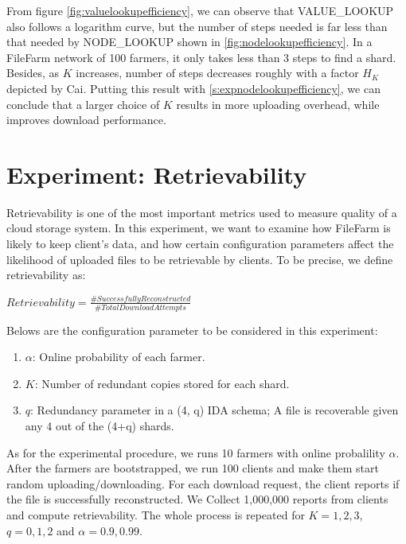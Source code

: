 From figure \ref{fig:valuelookupefficiency}, we can observe that VALUE\_LOOKUP also follows a logarithm curve, but the number of steps needed is far less than that needed by NODE\_LOOKUP shown in \ref{fig:nodelookupefficiency}. In a FileFarm network of 100 farmers, it only takes less than 3 steps to find a shard. Besides, as $K$ increases, number of steps decreases roughly with a factor $H_{K}$ depicted by Cai\cite{cai2013probabilistic}. Putting this result with \ref{s:expnodelookupefficiency}, we can conclude that a larger choice of $K$ results in more uploading overhead, while improves download performance.

\section{Experiment: Retrievability}
\label{s:expretrievability}

Retrievability is one of the most important metrics used to measure quality of a cloud storage system. In this experiment, we want to examine how FileFarm is likely to keep client's data, and how certain configuration parameters affect the likelihood of uploaded files to be retrievable by clients. To be precise, we define retrievability as:

\begin{center}
  $Retrievability = \frac{\# Successfully Reconstructed}{\# Total Download Attempts}$
\end{center}

\noindent Belows are the configuration parameter to be considered in this experiment:

\begin{enumerate}
  \item $\alpha$: Online probability of each farmer.
  \item $K$: Number of redundant copies stored for each shard.
  \item $q$: Redundancy parameter in a (4, q) IDA schema; A file is recoverable given any 4 out of the (4+q) shards.
\end{enumerate}

As for the experimental procedure, we runs 10 farmers with online probalility $\alpha$. After the farmers are bootstrapped, we run 100 clients and make them start random uploading/downloading. For each download request, the client reports if the file is successfully reconstructed. We Collect 1,000,000 reports from clients and compute retrievability. The whole process is repeated for $K=1,2,3$, $q=0,1,2$ and $\alpha=0.9,0.99$.

